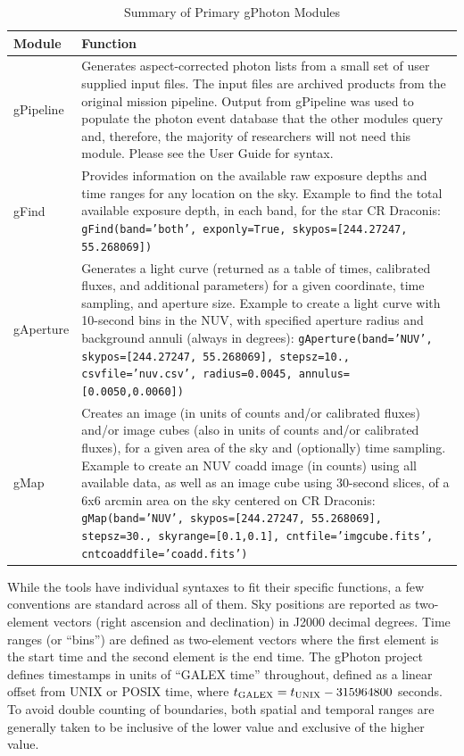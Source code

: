 \documentclass[preprint]{aastex}
\begin{document}
\begin{table}[h]
\begin{tabular}{|L{2cm}|L{13cm}|}
\hline
	{\bf Module} & {\bf Function}\\\hline
	gPipeline & Generates aspect-corrected photon lists from a small set of user supplied input files. The input files are archived products from the original mission pipeline. Output from gPipeline was used to populate the photon event database that the other modules query and, therefore, the majority of researchers will not need this module. Please see the User Guide for syntax.\\\hline
	gFind & Provides information on the available raw exposure depths and time ranges for any location on the sky. Example to find the total available exposure depth, in each band, for the star CR Draconis: \parbox[t]{13cm}{\texttt{gFind(band='both', exponly=True, skypos=[244.27247, 55.268069])}}\\\hline
	gAperture & Generates a light curve (returned as a table of times, calibrated fluxes, and additional parameters) for a given coordinate, time sampling, and aperture size. Example to create a light curve with 10-second bins in the NUV, with specified aperture radius and background annuli (always in degrees): \parbox[t]{13cm}{\texttt{gAperture(band='NUV', skypos=[244.27247, 55.268069], stepsz=10., csvfile='nuv.csv', radius=0.0045, annulus=[0.0050,0.0060])}}\\\hline
	gMap & Creates an image (in units of counts and/or calibrated fluxes) and/or image cubes (also in units of counts and/or calibrated fluxes), for a given area of the sky and (optionally) time sampling. Example to create an NUV coadd image (in counts) using all available data, as well as an image cube using 30-second slices, of a 6x6 arcmin area on the sky centered on CR Draconis: \parbox[t]{13cm}{\texttt{gMap(band='NUV', skypos=[244.27247, 55.268069], stepsz=30., skyrange=[0.1,0.1], cntfile='imgcube.fits', cntcoaddfile='coadd.fits')}}\\\hline
\end{tabular}
\caption{Summary of Primary gPhoton Modules}
\label{moduledesc}
\end{table}

While the tools have individual syntaxes to fit their specific functions, a few conventions are standard across all of them. Sky positions are reported as two-element vectors (right ascension and declination) in J2000 decimal degrees. Time ranges (or ``bins'') are defined as two-element vectors where the first element is the start time and the second element is the end time. The gPhoton project defines timestamps in units of ``GALEX time'' throughout, defined as a linear offset from UNIX or POSIX time, where $t_{\rm{GALEX}} = t_{\rm{UNIX}} - 315964800$ seconds. To avoid double counting of boundaries, both spatial and temporal ranges are generally taken to be inclusive of the lower value and exclusive of the higher value.
\end{document}
